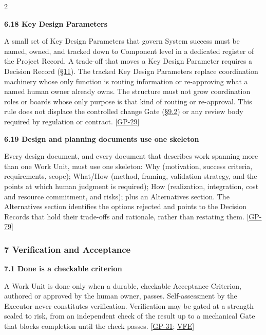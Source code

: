 \begin{multicols}{2}
\hypertarget{nss-6.18}{}

\par\smallskip\noindent\textbf{6.18 Key Design Parameters}\par\nopagebreak

A small set of Key Design Parameters that govern System success must be named, owned, and tracked down to Component level in a dedicated register of the Project Record. A trade-off that moves a Key Design Parameter requires a Decision Record (\hyperlink{nss-11}{\S11}). The tracked Key Design Parameters replace coordination machinery whose only function is routing information or re-approving what a named human owner already owns. The structure must not grow coordination roles or boards whose only purpose is that kind of routing or re-approval. This rule does not displace the controlled change Gate (\hyperlink{nss-9.2}{\S9.2}) or any review body required by regulation or contract. [\hyperlink{gp-29}{GP-29}]

\hypertarget{nss-6.19}{}

\par\smallskip\noindent\textbf{6.19 Design and planning documents use one skeleton}\par\nopagebreak

Every design document, and every document that describes work spanning more than one Work Unit, must use one skeleton: Why (motivation, success criteria, requirements, scope); What/How (method, framing, validation strategy, and the points at which human judgment is required); How (realization, integration, cost and resource commitment, and risks); plus an Alternatives section. The Alternatives section identifies the options rejected and points to the Decision Records that hold their trade-offs and rationale, rather than restating them. [\hyperlink{gp-79}{GP-79}]

\hypertarget{nss-7}{}

\subsubsection*{7 Verification and Acceptance}

\hypertarget{nss-7.1}{}

\par\smallskip\noindent\textbf{7.1 Done is a checkable criterion}\par\nopagebreak

A Work Unit is done only when a durable, checkable Acceptance Criterion, authored or approved by the human owner, passes. Self-assessment by the Executor never constitutes verification. Verification may be gated at a strength scaled to risk, from an independent check of the result up to a mechanical Gate that blocks completion until the check passes. [\hyperlink{gp-31}{GP-31}; \hyperlink{gp-VFE}{VFE}]


\end{multicols}
